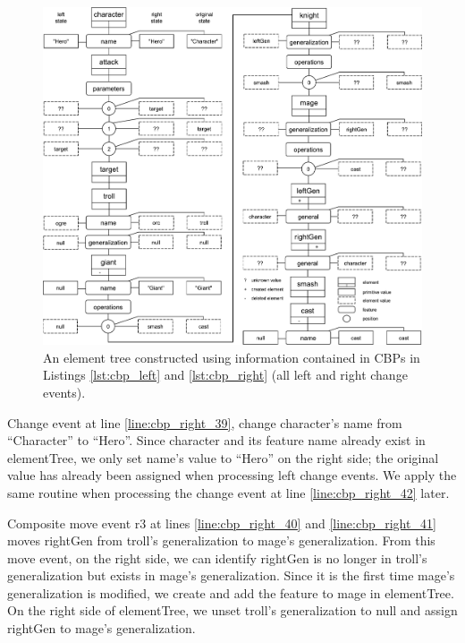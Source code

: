 \begin{figure}[]
\centering
\includegraphics[width=\linewidth]{element_tree_game_right}
\caption{An element tree constructed using information contained in CBPs in Listings \ref{lst:cbp_left} and \ref{lst:cbp_right} (all left and right change events).}
\label{fig:right_element_tree_diagram}
\end{figure} 

Change event at line \ref{line:cbp_right_39}, change \textsf{character}'s \textsf{name} from ``Character'' to ``Hero''. Since \textsf{character} and its feature \textsf{name} already exist in \textsf{elementTree}, we only set \textsf{name}'s value to ``Hero'' on the right side; the original value has already been assigned when processing left change events. We apply the same routine when processing the change event at line \ref{line:cbp_right_42} later.

Composite move event \textsf{r3} at lines \ref{line:cbp_right_40} and \ref{line:cbp_right_41} moves \textsf{rightGen} from \textsf{troll}'s \textsf{generalization} to \textsf{mage}'s \textsf{generalization}. From this move event, on the right side, we can identify \textsf{rightGen} is no longer in \textsf{troll}'s \textsf{generalization} but exists in \textsf{mage}'s \textsf{generalization}. Since it is the first time \textsf{mage}'s \textsf{generalization} is modified, we create and add the feature to \textsf{mage} in \textsf{elementTree}. On the right side of \textsf{elementTree}, we unset \textsf{troll}'s \textsf{generalization} to null and assign \textsf{rightGen} to \textsf{mage}'s \textsf{generalization}.

